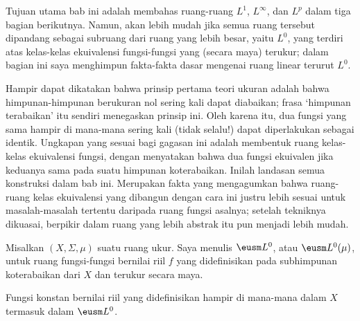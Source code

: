 
\loadeusm

\def\chaptername{Ruang fungsi}
\def\sectionname{$\eusm L^0$ dan $L^0$}


Tujuan utama bab ini adalah membahas ruang-ruang $L^1$, $L^{\infty}$,
dan $L^p$ dalam tiga bagian berikutnya. Namun, akan lebih mudah jika semua
ruang tersebut dipandang sebagai subruang dari ruang yang lebih besar,
yaitu $L^0$, yang terdiri atas kelas-kelas ekuivalensi fungsi-fungsi yang
(secara maya) terukur; dalam bagian ini saya menghimpun fakta-fakta dasar
mengenai ruang linear terurut $L^0$.

Hampir dapat dikatakan bahwa prinsip pertama teori ukuran adalah bahwa
himpunan-himpunan berukuran nol sering kali dapat diabaikan; frasa
`himpunan terabaikan' itu sendiri menegaskan prinsip ini. Oleh karena itu,
dua fungsi yang sama hampir di mana-mana sering kali (tidak selalu!) dapat
diperlakukan sebagai identik. Ungkapan yang sesuai bagi gagasan ini adalah
membentuk ruang kelas-kelas ekuivalensi fungsi, dengan menyatakan bahwa dua
fungsi ekuivalen jika keduanya sama pada suatu himpunan koterabaikan. Inilah
landasan semua konstruksi dalam bab ini. Merupakan fakta yang mengagumkan
bahwa ruang-ruang kelas ekuivalensi yang dibangun dengan cara ini justru
lebih sesuai untuk masalah-masalah tertentu daripada ruang fungsi asalnya;
setelah tekniknya dikuasai, berpikir dalam ruang yang lebih abstrak itu pun
menjadi lebih mudah.


Misalkan $(X,\Sigma,\mu)$ suatu ruang ukur.
Saya menulis $\eusm L^0$, atau $\eusm L^0(\mu)$, untuk ruang
fungsi-fungsi bernilai riil $f$ yang didefinisikan pada subhimpunan
koterabaikan dari $X$ dan terukur secara maya.

 Fungsi konstan bernilai riil yang didefinisikan hampir di
mana-mana dalam $X$ termasuk dalam $\eusm L^0$.

